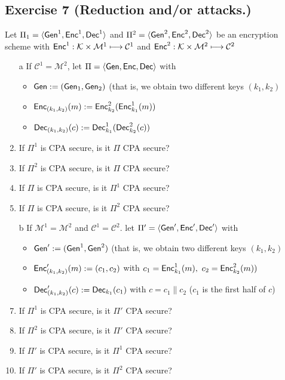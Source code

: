 \subsection{Exercise 7 (Reduction and/or attacks.)}
Let $\Pi_1=\langle \operatorname{\mathsf{Gen}}^1,\operatorname{\mathsf{Enc}}^1,\operatorname{\mathsf{Dec}}^1\rangle$ and $\Pi^2=\langle \operatorname{\mathsf{Gen}}^2,\operatorname{\mathsf{Enc}}^2,\operatorname{\mathsf{Dec}}^2\rangle$ be an encryption scheme with $\operatorname{\mathsf{Enc}}^1:\mathcal{K}\times \mathcal{M}^1 \longmapsto \mathcal{C}^1$ and $\operatorname{\mathsf{Enc}}^2:\mathcal{K}\times \mathcal{M}^2 \longmapsto \mathcal{C}^2$ 
\begin{enumerate}
\item[a] If $\mathcal{C}^1 = \mathcal{M}^2$, let $\Pi=\langle \operatorname{\mathsf{Gen}},\operatorname{\mathsf{Enc}},\operatorname{\mathsf{Dec}}\rangle$ with
\begin{itemize}
  \item $\operatorname{\mathsf{Gen}}:=(\operatorname{\mathsf{Gen}}_1,\operatorname{\mathsf{Gen}}_2)$ (that is, we obtain two different keys $(k_1,k_2)$
  \item $\operatorname{\mathsf{Enc}}_{(k_1,k_2)}(m):=\operatorname{\mathsf{Enc}}_{k_2}^2(\operatorname{\mathsf{Enc}}^1_{k_1}(m))$ 
  \item $\operatorname{\mathsf{Dec}}_{(k_1,k_2)}(c):=\operatorname{\mathsf{Dec}}^1_{k_1}(\operatorname{\mathsf{Dec}}^2_{k_2}(c))$ 
\end{itemize}
\smallskip
\item If $\Pi^1$ is CPA secure, is it $\Pi$ CPA secure?
\item If $\Pi^2$ is CPA secure, is it $\Pi$ CPA secure? 
\item If $\Pi$ is CPA secure, is it $\Pi^1$ CPA secure?
\item If $\Pi$ is CPA secure, is it $\Pi^2$ CPA secure?
\item[b] If $\mathcal{M}^1 = \mathcal{M}^2$ and $\mathcal{C}^1 = \mathcal{C}^2$. let $\Pi'=\langle \operatorname{\mathsf{Gen}}',\operatorname{\mathsf{Enc}}',\operatorname{\mathsf{Dec}}'\rangle$ with
\begin{itemize}
  \item $\operatorname{\mathsf{Gen}}':=(\operatorname{\mathsf{Gen}}^1,\operatorname{\mathsf{Gen}}^2)$ (that is, we obtain two different keys $(k_1,k_2)$
  \item $\operatorname{\mathsf{Enc}}'_{(k_1,k_2)}(m):=(c_1,c_2)$ with $c_1=\operatorname{\mathsf{Enc}}^1_{k_1}(m),~c_2=\operatorname{\mathsf{Enc}}^2_{k_2}(m))$ 
  \item $\operatorname{\mathsf{Dec}}'_{(k_1,k_2)}(c):=\operatorname{\mathsf{Dec}}_{k_1}(c_1)$ with $c=c_1\|c_2$ ($c_1$ is the first half of $c$)
\end{itemize}
\smallskip
\item If $\Pi^1$ is CPA secure, is it $\Pi'$ CPA secure?
\item If $\Pi^2$ is CPA secure, is it $\Pi'$ CPA secure? 
\item If $\Pi'$ is CPA secure, is it $\Pi^1$ CPA secure?
\item If $\Pi'$ is CPA secure, is it $\Pi^2$ CPA secure?
\end{enumerate}
